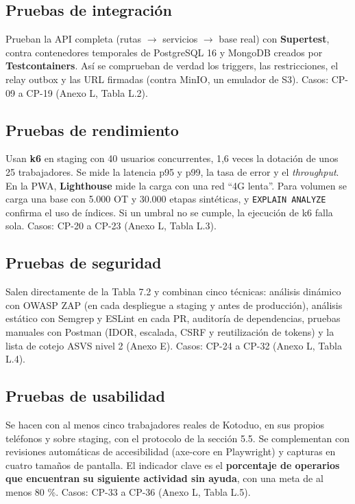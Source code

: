 \documentclass[11pt,a4paper]{article}
\begin{document}
\subsection{Pruebas de integración}

Prueban la API completa (rutas \ensuremath{\rightarrow}\allowbreak{} servicios \ensuremath{\rightarrow}\allowbreak{} base real) con \textbf{Supertest}, contra contenedores temporales de PostgreSQL 16 y MongoDB creados por \textbf{Testcontainers}. Así se comprueban de verdad los triggers, las restricciones, el relay outbox y las URL firmadas (contra MinIO, un emulador de S3). Casos: CP-09 a CP-19 (Anexo L, Tabla L.2).

\subsection{Pruebas de rendimiento}

Usan \textbf{k6} en staging con 40 usuarios concurrentes, 1,6 veces la dotación de unos 25 trabajadores. Se mide la latencia p95 y p99, la tasa de error y el \textit{throughput}. En la PWA, \textbf{Lighthouse} mide la carga con una red ``4G lenta''. Para volumen se carga una base con 5.000 OT y 30.000 etapas sintéticas, y \texttt{EXPLAIN ANALYZE} confirma el uso de índices. Si un umbral no se cumple, la ejecución de k6 falla sola. Casos: CP-20 a CP-23 (Anexo L, Tabla L.3).

\subsection{Pruebas de seguridad}

Salen directamente de la Tabla 7.2 y combinan cinco técnicas: análisis dinámico con OWASP ZAP (en cada despliegue a staging y antes de producción), análisis estático con Semgrep y ESLint en cada PR, auditoría de dependencias, pruebas manuales con Postman (IDOR, escalada, CSRF y reutilización de tokens) y la lista de cotejo ASVS nivel 2 (Anexo E). Casos: CP-24 a CP-32 (Anexo L, Tabla L.4).

\subsection{Pruebas de usabilidad}

Se hacen con al menos cinco trabajadores reales de Kotoduo, en sus propios teléfonos y sobre staging, con el protocolo de la sección 5.5. Se complementan con revisiones automáticas de accesibilidad (axe-core en Playwright) y capturas en cuatro tamaños de pantalla. El indicador clave es el \textbf{porcentaje de operarios que encuentran su siguiente actividad sin ayuda}, con una meta de al menos 80 \%. Casos: CP-33 a CP-36 (Anexo L, Tabla L.5).
\end{document}
